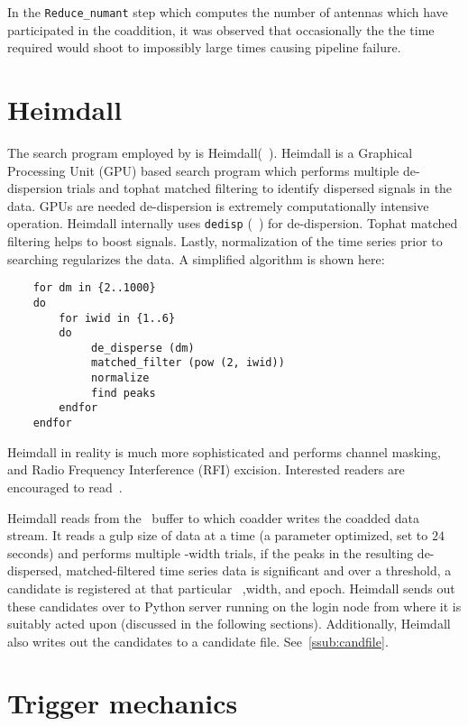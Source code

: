 \par In the \texttt{Reduce\_numant} step which computes the number of antennas which have participated in the coaddition,
it was observed that occasionally the the time required would shoot to impossibly large times causing pipeline failure.


\section {Heimdall}

\par The search program employed by \vf is Heimdall(~\cite{heimdall}). 
Heimdall is a Graphical Processing Unit (GPU) based search program which performs multiple de-dispersion trials and tophat matched filtering to identify dispersed signals in the data.
GPUs are needed de-dispersion is extremely computationally intensive operation. 
Heimdall internally uses \texttt{dedisp} (~\cite{dedisp}) for de-dispersion.
Tophat matched filtering helps to boost signals. Lastly, normalization of the time series prior to searching regularizes the data.
A simplified algorithm is shown here:
\begin{verbatim}
	for dm in {2..1000} 
	do
		for iwid in {1..6}
		do
			 de_disperse (dm) 
			 matched_filter (pow (2, iwid))
			 normalize
			 find peaks
		endfor
	endfor
\end{verbatim}

Heimdall in reality is much more sophisticated and performs channel masking, and Radio Frequency Interference (RFI) excision. Interested readers are encouraged to read~\cite{heimdall}.

\par Heimdall reads from the \dada~buffer to which coadder writes the coadded data stream. 
It reads a gulp size of data at a time (a parameter optimized, set to $24$ seconds) and performs multiple
\dm-width trials, if the peaks in the resulting de-dispersed, matched-filtered time series data is significant and over a threshold, 
a candidate is registered at that particular \dm~,width, and epoch.
Heimdall sends out these candidates over to Python server running on the login node from where it is suitably acted upon (discussed in the following sections). 
Additionally, Heimdall also writes out the candidates to a candidate file. See~\autoref{ssub:candfile}.

\section {Trigger mechanics}
\label{sec:tmech}

